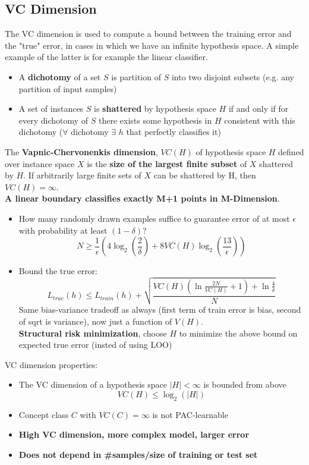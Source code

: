 \subsection{VC Dimension}
    The VC dimension is used to compute a bound between the training error and the "true" error, in cases in which we have an infinite hypothesis space. A simple example of the latter is for example the linear classifier.
    \begin{itemize}
        \item A \textbf{dichotomy} of a set $S$ is partition of $S$ into two disjoint subsets (e.g. any partition of input samples)
        \item A set of instances $S$ is \textbf{shattered} by hypothesis space $H$ if and only if for every dichotomy of $S$ there exists some hypothesis in $H$ consistent with this dichotomy ($\forall$ dichotomy $\exists$ $h$ that perfectly classifies it)
    \end{itemize}
    The \textbf{Vapnic-Chervonenkis dimension}, $VC(H)$ of hypothesis space $H$ defined over instance space $X$ is the \textbf{size of the largest finite subset} of $X$ shattered by $H$. If arbitrarily large finite sets of $X$ can be shattered by H, then $VC(H)=\infty$.\\
    \textbf{A linear boundary classifies exactly M+1 points in M-Dimension}.
    \begin{itemize}
        \item How many randomly drawn examples suffice to guarantee error of at most $\epsilon$ with probability at least $(1-\delta)$?
        $$N\geq \frac{1}{\epsilon}\left(4\log_2\left(\frac{2}{\delta}\right)+8VC(H)\log_2\left(\frac{13}{\epsilon}\right)\right)$$
        \item Bound the true error:
        $$L_{true}(h)\leq L_{train}(h)+\sqrt{\frac{
            VC(H)\left(\ln\frac{2N}{VC(H)}+1\right)+\ln\frac{4}{\delta}
        }{N}}$$
        Same bias-variance tradeoff as always (first term of train error is bias, second of sqrt is variance), now just a function of $V(H)$.\\
        \textbf{Structural risk minimization}, choose $H$ to minimize the above bound on expected true error (insted of using LOO)
    \end{itemize}
    VC dimension properties:
    \begin{itemize}
        \item The VC dimension of a hypothesis space $|H|<\infty$ is bounded from above
        $$VC(H)\leq\log_2(|H|)$$
        \item Concept class $C$ with $VC(C)=\infty$ is not PAC-learnable
        \item \textbf{High VC dimension, more complex model, larger error}
        \item \textbf{Does not depend in \#samples/size of training or test set}
    \end{itemize}